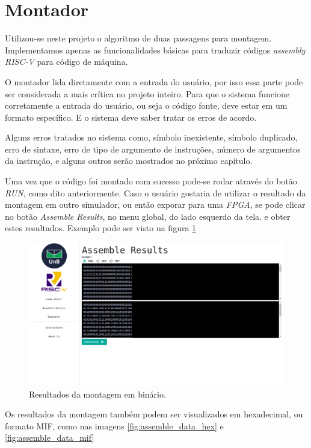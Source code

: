 	
\section{Montador}
	
	Utilizou-se neste projeto o algoritmo de duas passagens para montagem. Implementamos apenas as funcionalidades básicas para traduzir códigos \textit{assembly RISC-V} para código de máquina.

	O montador lida diretamente com a entrada do usuário, por isso essa parte pode ser considerada a mais crítica no projeto inteiro. Para que o sistema funcione corretamente a entrada do usuário, ou seja o código fonte, deve estar em um formato específico. E o sistema deve saber tratar os erros de acordo. 

	Alguns erros tratados no sistema como, símbolo inexistente, símbolo duplicado, erro de sintaxe, erro de tipo de argumento de instruções, número de argumentos da instrução, e alguns outros serão mostrados no próximo capítulo.

	Uma vez que o código foi montado com sucesso pode-se rodar através do botão \textit{RUN}, como dito anteriormente. Caso o usuário gostaria de utilizar o resultado da montagem em outro simulador, ou então exporar para uma \textit{FPGA}, se pode clicar no botão \textit{Assemble Results}, no menu global, do lado esquerdo da tela. e obter estes resultados. Exemplo pode ser visto na figura \ref{fig:assemble_data_bin}

	\begin{figure}[h]
	  \includegraphics[width=\linewidth]{img/assemble_data_bin.png}
	  \caption{Resultados da montagem em binário.}
	  \label{fig:assemble_data_bin}
	\end{figure}

	Os resultados da montagem também podem ser visualizados em hexadecimal, ou formato MIF, como nas imagens \ref{fig:assemble_data_hex} e \ref{fig:assemble_data_mif}

